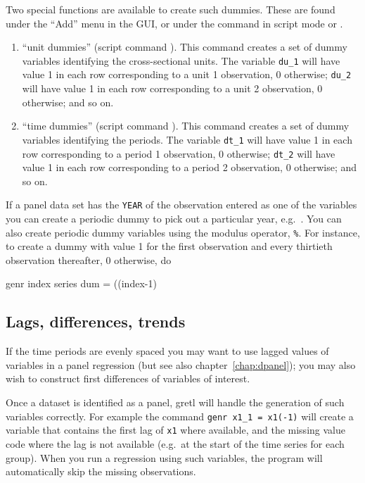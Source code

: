 Two special functions are available to create such dummies.  These are
found under the ``Add'' menu in the GUI, or under the 
command in script mode or .

\begin{enumerate}
\item ``unit dummies'' (script command ).  This
  command creates a set of dummy variables identifying the
  cross-sectional units.  The variable \verb+du_1+ will have value 1
  in each row corresponding to a unit 1 observation, 0 otherwise;
  \verb+du_2+ will have value 1 in each row corresponding to a unit 2
  observation, 0 otherwise; and so on.
\item ``time dummies'' (script command ).  This
  command creates a set of dummy variables identifying the periods.
  The variable \verb+dt_1+ will have value 1 in each row
  corresponding to a period 1 observation, 0 otherwise; \verb+dt_2+
  will have value 1 in each row corresponding to a period 2
  observation, 0 otherwise; and so on.
\end{enumerate}

If a panel data set has the \verb+YEAR+ of the observation entered as
one of the variables you can create a periodic dummy to pick out a
particular year, e.g.\ .  You can also
create periodic dummy variables using the modulus operator,
\verb+%+.  For instance, to create a dummy with
value 1 for the first observation and every thirtieth observation
thereafter, 0 otherwise, do
%
\begin{code}
genr index 
series dum = ((index-1) %
\end{code}

\subsection{Lags, differences, trends}
\label{panel-lagged}

If the time periods are evenly spaced you may want to use lagged
values of variables in a panel regression (but see also
chapter~\ref{chap:dpanel}); you may also wish to construct first
differences of variables of interest.

Once a dataset is identified as a panel, gretl will handle the
generation of such variables correctly.  For example the command
\verb+genr x1_1 = x1(-1)+ will create a variable that contains the
first lag of \verb+x1+ where available, and the missing value code
where the lag is not available (e.g.\ at the start of the time series
for each group).  When you run a regression using such variables, the
program will automatically skip the missing observations.

